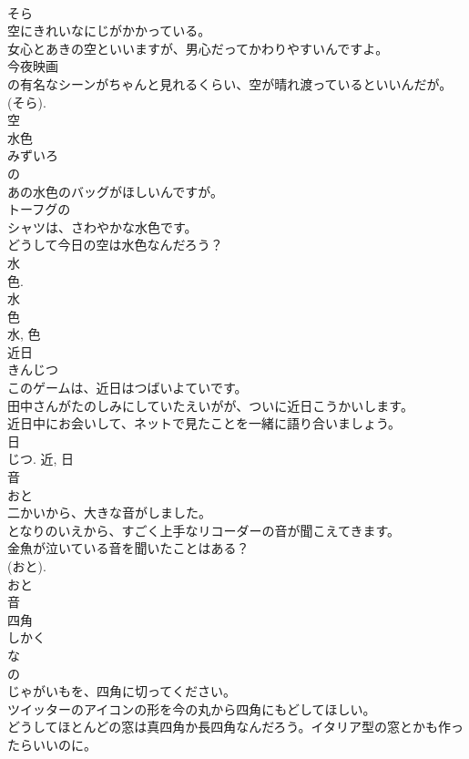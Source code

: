 \documentclass[8pt]{extreport}
\begin{document}
\begin{CJK}{UTF8}{min}
\\	そら	
\\	空にきれいなにじがかかっている。	
\\	女心とあきの空といいますが、男心だってかわりやすいんですよ。	
\\	今夜映画
\\	の有名なシーンがちゃんと見れるくらい、空が晴れ渡っているといいんだが。	
\\	(そら). 
\\	空	
\\	水色	
\\	みずいろ	
\\	の 
\\	あの水色のバッグがほしいんですが。	
\\	トーフグの
\\	シャツは、さわやかな水色です。	
\\	どうして今日の空は水色なんだろう？	
\\	水 
\\	色. 
\\	水 
\\	色 
\\	水, 色	
\\	近日	
\\	きんじつ	
\\	このゲームは、近日はつばいよていです。	
\\	田中さんがたのしみにしていたえいがが、ついに近日こうかいします。	
\\	近日中にお会いして、ネットで見たことを一緒に語り合いましょう。	
\\	日 
\\	じつ.	近, 日	
\\	音	
\\	おと	
\\	二かいから、大きな音がしました。	
\\	となりのいえから、すごく上手なリコーダーの音が聞こえてきます。	
\\	金魚が泣いている音を聞いたことはある？	
\\	(おと). 
\\	おと 
\\	音	
\\	四角	
\\	しかく	
\\	な 
\\	の 
\\	じゃがいもを、四角に切ってください。	
\\	ツイッターのアイコンの形を今の丸から四角にもどしてほしい。	
\\	どうしてほとんどの窓は真四角か長四角なんだろう。イタリア型の窓とかも作ったらいいのに。	

\end{CJK}
\end{document}
